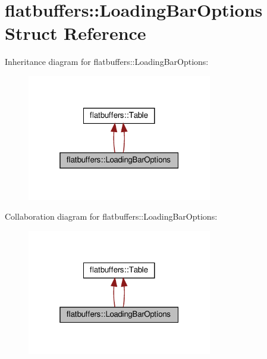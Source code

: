\hypertarget{structflatbuffers_1_1LoadingBarOptions}{}\section{flatbuffers\+:\+:Loading\+Bar\+Options Struct Reference}
\label{structflatbuffers_1_1LoadingBarOptions}


Inheritance diagram for flatbuffers\+:\+:Loading\+Bar\+Options\+:
\nopagebreak
\begin{figure}[H]
\begin{center}
\leavevmode
\includegraphics[width=229pt]{structflatbuffers_1_1LoadingBarOptions__inherit__graph}
\end{center}
\end{figure}


Collaboration diagram for flatbuffers\+:\+:Loading\+Bar\+Options\+:
\nopagebreak
\begin{figure}[H]
\begin{center}
\leavevmode
\includegraphics[width=229pt]{structflatbuffers_1_1LoadingBarOptions__coll__graph}
\end{center}
\end{figure}
